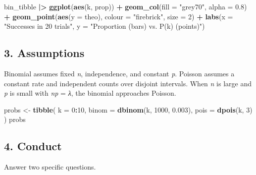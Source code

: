 \documentclass[
]{article}
\newenvironment{Shaded}{\begin{snugshade}}{\end{snugshade}}
\newcommand{\AttributeTok}[1]{\textcolor[rgb]{0.13,0.29,0.53}{#1}}
\newcommand{\DecValTok}[1]{\textcolor[rgb]{0.00,0.00,0.81}{#1}}
\newcommand{\FloatTok}[1]{\textcolor[rgb]{0.00,0.00,0.81}{#1}}
\newcommand{\FunctionTok}[1]{\textcolor[rgb]{0.13,0.29,0.53}{\textbf{#1}}}
\newcommand{\NormalTok}[1]{#1}
\newcommand{\OtherTok}[1]{\textcolor[rgb]{0.56,0.35,0.01}{#1}}
\newcommand{\SpecialCharTok}[1]{\textcolor[rgb]{0.81,0.36,0.00}{\textbf{#1}}}
\newcommand{\StringTok}[1]{\textcolor[rgb]{0.31,0.60,0.02}{#1}}
\begin{document}
\begin{Shaded}
\begin{Highlighting}[]
\NormalTok{bin\_tibble }\SpecialCharTok{|\textgreater{}}
  \FunctionTok{ggplot}\NormalTok{(}\FunctionTok{aes}\NormalTok{(k, prop)) }\SpecialCharTok{+}
  \FunctionTok{geom\_col}\NormalTok{(}\AttributeTok{fill =} \StringTok{"grey70"}\NormalTok{, }\AttributeTok{alpha =} \FloatTok{0.8}\NormalTok{) }\SpecialCharTok{+}
  \FunctionTok{geom\_point}\NormalTok{(}\FunctionTok{aes}\NormalTok{(}\AttributeTok{y =}\NormalTok{ theo), }\AttributeTok{colour =} \StringTok{"firebrick"}\NormalTok{, }\AttributeTok{size =} \DecValTok{2}\NormalTok{) }\SpecialCharTok{+}
  \FunctionTok{labs}\NormalTok{(}\AttributeTok{x =} \StringTok{"Successes in 20 trials"}\NormalTok{,}
       \AttributeTok{y =} \StringTok{"Proportion (bars) vs. P(k) (points)"}\NormalTok{)}
\end{Highlighting}
\end{Shaded}

\subsection{3. Assumptions}\label{assumptions}

Binomial assumes fixed \emph{n}, independence, and constant \emph{p}.
Poisson assumes a constant rate and independent counts over disjoint
intervals. When \emph{n} is large and \emph{p} is small with \emph{np} =
\emph{λ}, the binomial approaches Poisson.

\begin{Shaded}
\begin{Highlighting}[]
\NormalTok{probs }\OtherTok{\textless{}{-}} \FunctionTok{tibble}\NormalTok{(}
  \AttributeTok{k =} \DecValTok{0}\SpecialCharTok{:}\DecValTok{10}\NormalTok{,}
  \AttributeTok{binom  =} \FunctionTok{dbinom}\NormalTok{(k, }\DecValTok{1000}\NormalTok{, }\FloatTok{0.003}\NormalTok{),}
  \AttributeTok{pois   =} \FunctionTok{dpois}\NormalTok{(k, }\DecValTok{3}\NormalTok{)}
\NormalTok{)}
\NormalTok{probs}
\end{Highlighting}
\end{Shaded}

\subsection{4. Conduct}\label{conduct}

Answer two specific questions.
\end{document}
